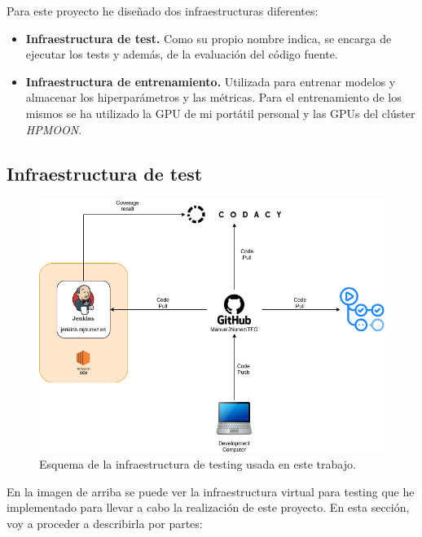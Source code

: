Para este proyecto he diseñado dos infraestructuras diferentes:

\begin{itemize}
    \item \textbf{Infraestructura de test.} Como su propio nombre indica, se encarga de ejecutar los tests y además, de la evaluación del código fuente.
    \item \textbf{Infraestructura de entrenamiento.} Utilizada para entrenar modelos y almacenar los hiperparámetros y las métricas. Para el entrenamiento de los mismos se ha utilizado la GPU de mi portátil personal y las GPUs del clúster \textit{HPMOON}.
\end{itemize}

\subsection{Infraestructura de test}

\begin{figure}[H]
	\includegraphics[width=1.\linewidth]{imagenes/05_Implementacion/testinfra.png}
	\centering
	\caption{Esquema de la infraestructura de testing usada en este trabajo.}
\end{figure}

En la imagen de arriba se puede ver la infraestructura virtual para testing que he implementado para llevar a cabo la realización de este proyecto. En esta sección, voy a proceder a describirla por partes:\newline

